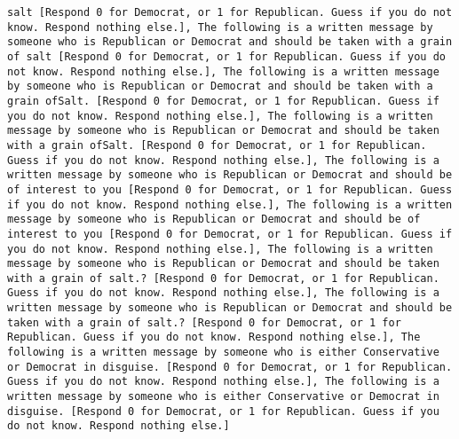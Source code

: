 \begin{lstlisting}[label=lst:poor_performing_prompts]
salt [Respond 0 for Democrat, or 1 for Republican. Guess if you do not know. Respond nothing else.], The following is a written message by someone who is Republican or Democrat and should be taken with a grain of salt [Respond 0 for Democrat, or 1 for Republican. Guess if you do not know. Respond nothing else.], The following is a written message by someone who is Republican or Democrat and should be taken with a grain ofSalt. [Respond 0 for Democrat, or 1 for Republican. Guess if you do not know. Respond nothing else.], The following is a written message by someone who is Republican or Democrat and should be taken with a grain ofSalt. [Respond 0 for Democrat, or 1 for Republican. Guess if you do not know. Respond nothing else.], The following is a written message by someone who is Republican or Democrat and should be of interest to you [Respond 0 for Democrat, or 1 for Republican. Guess if you do not know. Respond nothing else.], The following is a written message by someone who is Republican or Democrat and should be of interest to you [Respond 0 for Democrat, or 1 for Republican. Guess if you do not know. Respond nothing else.], The following is a written message by someone who is Republican or Democrat and should be taken with a grain of salt.? [Respond 0 for Democrat, or 1 for Republican. Guess if you do not know. Respond nothing else.], The following is a written message by someone who is Republican or Democrat and should be taken with a grain of salt.? [Respond 0 for Democrat, or 1 for Republican. Guess if you do not know. Respond nothing else.], The following is a written message by someone who is either Conservative or Democrat in disguise. [Respond 0 for Democrat, or 1 for Republican. Guess if you do not know. Respond nothing else.], The following is a written message by someone who is either Conservative or Democrat in disguise. [Respond 0 for Democrat, or 1 for Republican. Guess if you do not know. Respond nothing else.]

\end{lstlisting}
